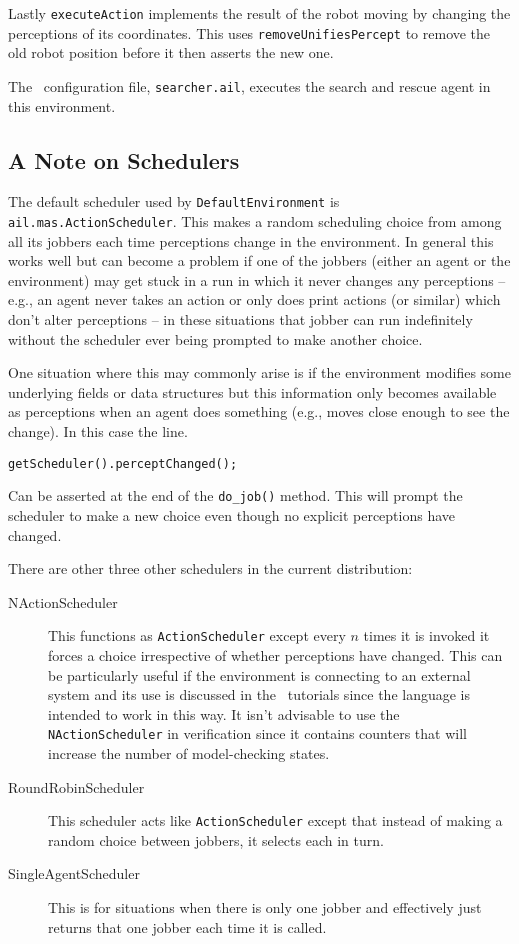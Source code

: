 Lastly \texttt{executeAction} implements the result of the robot moving by changing the perceptions of its coordinates.  This uses \texttt{removeUnifiesPercept} to remove the old robot position before it then asserts the new one.

The \ail\ configuration file, \texttt{searcher.ail}, executes the search and rescue agent in this environment.

\subsection{A Note on Schedulers}

\begin{sloppypar}
The default scheduler used by \texttt{DefaultEnvironment} is \texttt{ail.mas.ActionScheduler}.  This makes a random scheduling choice from among all its jobbers each time perceptions change in the environment.  In general this works well but can become a problem if one of the jobbers (either an agent or the environment) may get stuck in a run in which it never changes any perceptions -- e.g., an agent never takes an action or only does print actions (or similar) which don't alter perceptions -- in these situations that jobber can run indefinitely without the scheduler ever being prompted to make another choice.
\end{sloppypar}

One situation where this may commonly arise is if the environment modifies some underlying fields or data structures but this information only becomes available as perceptions when an agent does something (e.g., moves close enough to see the change).  In this case the line.
\begin{verbatim}
getScheduler().perceptChanged();
\end{verbatim}
Can be asserted at the end of the \texttt{do\_job()} method.  This will prompt the scheduler to make a new choice even though no explicit perceptions have changed.

There are other three other schedulers in the current distribution:

\begin{description}
\item[NActionScheduler] This functions as \texttt{ActionScheduler} except every $n$ times it is invoked it forces a choice irrespective of whether perceptions have changed.  This can be particularly useful if the environment is connecting to an external system and its use is discussed in the \eass\ tutorials since the language is intended to work in this way.  It isn't advisable to use the \texttt{NActionScheduler} in verification since it contains counters that will increase the number of model-checking states.
\item[RoundRobinScheduler]  This scheduler acts like \texttt{ActionScheduler} except that instead of making a random choice between jobbers, it selects each in turn.
\item[SingleAgentScheduler] This is for situations when there is only one jobber and effectively just returns that one jobber each time it is called.
\end{description}

